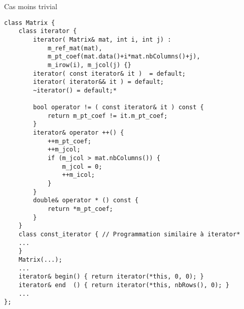 \documentclass[handout,10pt]{beamer}
\begin{document}
\begin{frame}[fragile]{Cas moins trivial}
\begin{lstlisting}
class Matrix {
    class iterator {
        iterator( Matrix& mat, int i, int j) : 
            m_ref_mat(mat),
            m_pt_coef(mat.data()+i*mat.nbColumns()+j), 
            m_irow(i), m_jcol(j) {}
        iterator( const iterator& it )  = default;
        iterator( iterator&& it ) = default;
        ~iterator() = default;*
               
        bool operator != ( const iterator& it ) const {
            return m_pt_coef != it.m_pt_coef;
        }
        iterator& operator ++() {
            ++m_pt_coef;
            ++m_jcol;
            if (m_jcol > mat.nbColumns()) {
                m_jcol = 0;
                ++m_icol;
            }
        }
        double& operator * () const {
            return *m_pt_coef;
        }
    }
    class const_iterator { // Programmation similaire à iterator*
    ...
    }
    Matrix(...);
    ...
    iterator& begin() { return iterator(*this, 0, 0); }
    iterator& end  () { return iterator(*this, nbRows(), 0); }
    ...
};
\end{lstlisting}
\end{frame}
\end{document}
